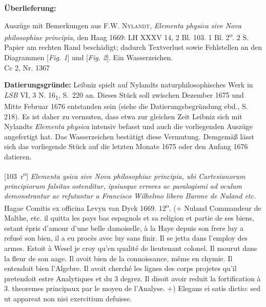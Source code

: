 \begin{ledgroupsized}[r]{120mm}%
\footnotesize%
\pstart%
\noindent\textbf{\"{U}berlieferung:}%
\pend%
\end{ledgroupsized}%
%  
\begin{ledgroupsized}[r]{114mm}%
\footnotesize%
\pstart \parindent -6mm%
%
Auszüge mit Bemerkungen aus \cite{00326}\textsc{F.W. Nylandt}, \textit{Elementa physica sive Nova philosophiae principia}, den Haag 1669:
LH XXXV 14, 2 Bl. 103. 1 Bl. 2\textsuperscript{o}. 2 S.
Papier am rechten Rand beschädigt; dadurch Textverlust sowie Fehlstellen an den Diagrammen [\textit{Fig. 1}] und [\textit{Fig. 2}]. Ein
Wasserzeichen.\\%
Cc 2, Nr. 1367%
\pend%
\end{ledgroupsized}%
\vspace*{5mm}%
\begin{ledgroup}%
\footnotesize%
\pstart%
\noindent\footnotesize{\textbf{Datierungsgr\"{u}nde:} %
Leibniz spielt auf Nylandts naturphilosophisches Werk in \cite{01116}\textit{LSB} VI, 3 N. 16\textsubscript{1}, S.~220 an.
Dieses Stück soll zwischen Dezember 1675 und Mitte Februar 1676 entstanden sein (siehe die Datierungsbegründung ebd., S. 218).
Es ist daher zu vermuten, dass etwa zur gleichen Zeit Leibniz sich mit Nylandts \textit{Elementa physica} intensiv befasst und auch die vorliegenden Auszüge angefertigt hat.
Das Wasserzeichen bestätigt diese Vermutung.
Demgemäß lässt sich das vorliegende Stück auf die letzten Monate 1675 oder den Anfang 1676 datieren.}%
\pend%
\end{ledgroup}%
\vspace*{8mm}%
\count{}
\count{}
\count{}
\pstart%
\normalsize%
\noindent%
[103~r\textsuperscript{o}] 
\cite{00326}\textit{Elementa ysica sive Nova philosophiae principia, ubi Cartesianorum principiorum falsitas ostenditur, ipsiusque errores ac paralogismi ad oculum demonstrantur ac refutantur a Francisco Wilhelmo libero Barone de Nuland etc.} Hagae\protect{} Comitis ex officina Levyn van Dyck\protect{} 1669. 12\textsuperscript{o}.
\pend%
\pstart%
(+ Nuland\protect{} Commandeur de Malthe\protect{}, etc. il quitta les pays bas espagnols\protect{} et sa religion et partie de ses biens, estant \'{e}pris d'amour d'une belle damoiselle, \`{a} la Haye\protect{} depuis son frere luy a refus\'{e} son bien, il a eu proc\`{e}s avec luy sans finir. Il se jetta dans l'employ des armes. Estoit \`{a} Wesel\protect{} je croy qu'en qualit\'{e} de lieutenant colonel. Il mourut dans la fleur de son aage. Il avoit bien de la connoissance, m\^{e}me en chymie. Il entendoit bien l'Algebre. Il avoit cherch\'{e} les lignes des corps projetes qu'il pretendoit estre Analytiques et du 3 degrez. Il disoit avoir reduit la fortification \`{a} 3. theoremes principaux par le moyen de l'Analyse. +) Elegans ei satis dictio: sed ut appareat non nisi exercitium defuisse. 
